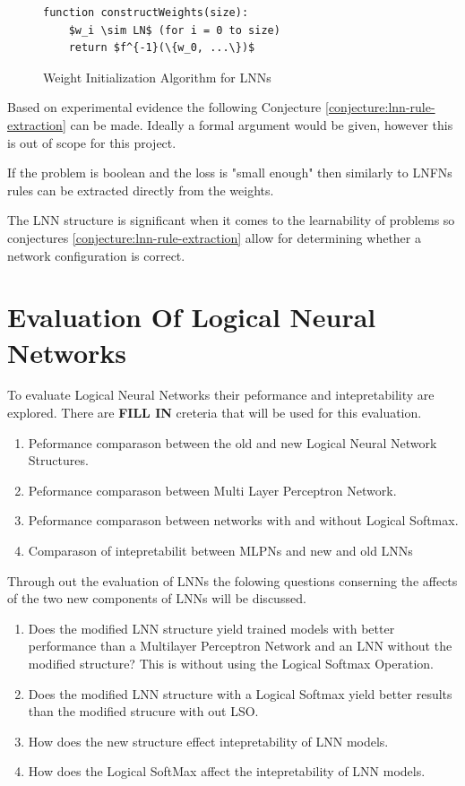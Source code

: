 \begin{figure}[H]
	\begin{lstlisting}[mathescape=true]
  function constructWeights(size):
    $w_i \sim LN$ (for i = 0 to size)
    return $f^{-1}(\{w_0, ...\})$
	\end{lstlisting}
	\caption{Weight Initialization Algorithm for LNNs}
	\label{alg:lnn-initlization}
\end{figure}

Based on experimental evidence the following Conjecture \ref{conjecture:lnn-rule-extraction} can be made. Ideally a formal argument would be given, however this is out of scope for this project.

\begin{conjecture}
	If the problem is boolean and the loss is "small enough" then similarly to LNFNs rules can be extracted directly from the weights.
	\label{conjecture:lnn-rule-extraction}
\end{conjecture}

The LNN structure is significant when it comes to the learnability of problems so conjectures \ref{conjecture:lnn-rule-extraction} allow for determining whether a network configuration is correct.


\chapter{Evaluation Of Logical Neural Networks} \label{C:evaluation-lnn}
To evaluate Logical Neural Networks their peformance and intepretability are explored. There are \textbf{FILL IN} creteria that will be used for this evaluation.

\begin{enumerate}
	\item Peformance comparason between the old and new Logical Neural Network Structures.
	\item Peformance comparason between Multi Layer Perceptron Network.
	\item Peformance comparason between networks with and without Logical Softmax.
	\item Comparason of intepretabilit between MLPNs and new and old LNNs
\end{enumerate}

Through out the evaluation of LNNs the folowing questions conserning the affects of the two new components of LNNs will be discussed.

\begin{enumerate}
	\item Does the modified LNN structure yield trained models with better performance than a Multilayer Perceptron Network and an LNN without the modified structure? This is without using the Logical Softmax Operation.
	\item Does the modified LNN structure with a Logical Softmax yield better results than the modified strucure with out LSO.
	\item How does the new structure effect intepretability of LNN models.
	\item How does the Logical SoftMax affect the intepretability of LNN models.
\end{enumerate}


